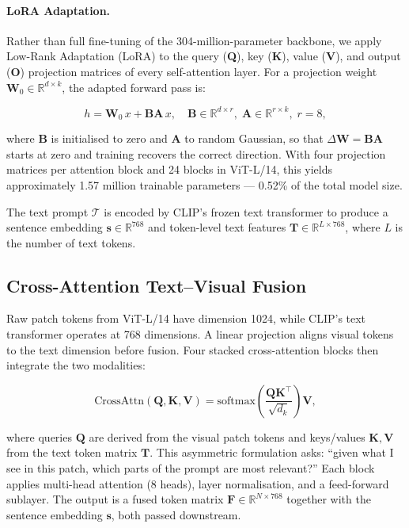 \documentclass[remotesensing,article,accept,moreauthors,pdftex]{Definitions/mdpi}
\begin{document}
\paragraph{LoRA Adaptation.}
Rather than full fine-tuning of the 304-million-parameter backbone, we apply
Low-Rank Adaptation (LoRA) \cite{hu2021lora} to the query (\textbf{Q}), key
(\textbf{K}), value (\textbf{V}), and output (\textbf{O}) projection matrices
of every self-attention layer. For a projection weight $\mathbf{W}_0 \in
\mathbb{R}^{d \times k}$, the adapted forward pass is:

\begin{equation}
  h = \mathbf{W}_0\,x + \mathbf{B}\mathbf{A}\,x,
  \quad \mathbf{B} \in \mathbb{R}^{d \times r},\;
  \mathbf{A} \in \mathbb{R}^{r \times k},\; r = 8,
  \label{eq:lora}
\end{equation}

\noindent where $\mathbf{B}$ is initialised to zero and $\mathbf{A}$ to
random Gaussian, so that $\Delta\mathbf{W}=\mathbf{BA}$ starts at zero and
training recovers the correct direction. With four projection matrices per
attention block and 24 blocks in ViT-L/14, this yields approximately 1.57
million trainable parameters — 0.52\% of the total model size.

The text prompt $\mathcal{T}$ is encoded by CLIP's frozen text
transformer to produce a sentence embedding
$\mathbf{s} \in \mathbb{R}^{768}$ and token-level text features
$\mathbf{T} \in \mathbb{R}^{L \times 768}$, where $L$ is the number of
text tokens.

\subsection{Cross-Attention Text--Visual Fusion}
\label{sec:crossattn}

Raw patch tokens from ViT-L/14 have dimension 1024, while CLIP's text
transformer operates at 768 dimensions. A linear projection aligns visual
tokens to the text dimension before fusion. Four stacked cross-attention
blocks then integrate the two modalities:

\begin{equation}
  \text{CrossAttn}(\mathbf{Q}, \mathbf{K}, \mathbf{V}) =
  \text{softmax}\!\left(\frac{\mathbf{Q}\mathbf{K}^\top}{\sqrt{d_k}}\right)\mathbf{V},
  \label{eq:crossattn}
\end{equation}

\noindent where queries $\mathbf{Q}$ are derived from the visual patch tokens
and keys/values $\mathbf{K}, \mathbf{V}$ from the text token matrix
$\mathbf{T}$. This asymmetric formulation asks: ``given what I see in this
patch, which parts of the prompt are most relevant?'' Each block applies
multi-head attention (8 heads), layer normalisation, and a feed-forward
sublayer. The output is a fused token matrix
$\mathbf{F} \in \mathbb{R}^{N \times 768}$ together with the sentence
embedding $\mathbf{s}$, both passed downstream.
\end{document}
